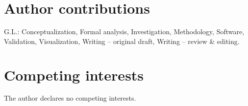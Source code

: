 \documentclass[
    Numbered,         %
]{sn-jnl}
\begin{document}

\linenumbers
\doublespacing
\renewcommand\abstractname{}







\maketitle











\section*{Author contributions}
G.L.: Conceptualization, Formal analysis, Investigation, Methodology,
Software, Validation, Visualization, Writing -- original draft,
Writing -- review \& editing.

\section*{Competing interests}
The author declares no competing interests.

\end{document}
